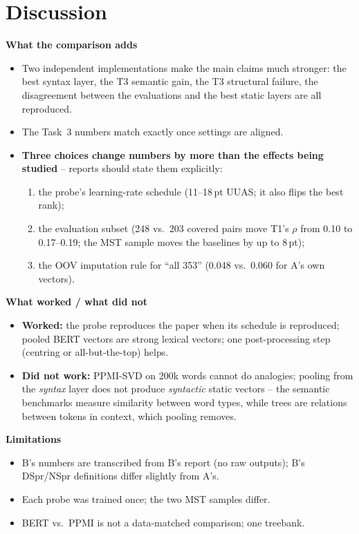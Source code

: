 \documentclass[11pt,a4paper]{article}
\newcommand{\pt}{\,pt}
\newcommand{\blk}[1]{\par\needspace{5\baselineskip}\smallskip\noindent\textbf{#1}\par\nobreak\vspace{1pt}}
\begin{document}
\section{Discussion}\label{sec:disc}
\blk{What the comparison adds}
\begin{itemize}
\item Two independent implementations make the main claims much stronger: the best syntax layer, the T3 semantic gain, the T3 structural
failure, the disagreement between the evaluations and the best static layers are all reproduced.
\item The Task~3 numbers match exactly once settings are aligned.
\item \textbf{Three choices change numbers by more than the effects being studied} -- reports should state them explicitly:
\begin{enumerate}
\item the probe's learning-rate schedule (11--18\pt{} UUAS; it also flips the best rank);
\item the evaluation subset (248 vs.\ 203 covered pairs move T1's $\rho$ from 0.10 to 0.17--0.19; the MST sample moves the baselines by up to 8\pt);
\item the OOV imputation rule for ``all 353'' (0.048 vs.\ 0.060 for A's own vectors).
\end{enumerate}
\end{itemize}
\blk{What worked / what did not}
\begin{itemize}
\item \textbf{Worked:} the probe reproduces the paper when its schedule is reproduced; pooled BERT vectors are strong lexical vectors; one
post-processing step (centring or all-but-the-top) helps.
\item \textbf{Did not work:} PPMI-SVD on 200k words cannot do analogies; pooling from the \emph{syntax} layer does not produce
\emph{syntactic} static vectors -- the semantic benchmarks measure similarity between word types, while trees are relations between tokens
in context, which pooling removes.
\end{itemize}
\blk{Limitations}
\begin{itemize}
\item B's numbers are transcribed from B's report (no raw outputs); B's DSpr/NSpr definitions differ slightly from A's.
\item Each probe was trained once; the two MST samples differ.
\item BERT vs.\ PPMI is not a data-matched comparison; one treebank.
\end{itemize}
\end{document}
